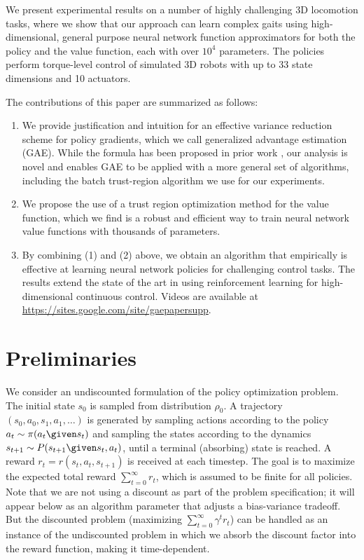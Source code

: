 \documentclass{article}
\begin{document}
We present experimental results on a number of highly challenging 3D locomotion tasks, where we show that our approach can learn complex gaits using high-dimensional, general purpose neural network function approximators for both the policy and the value function, each with over $10^4$ parameters.
The policies perform torque-level control of simulated 3D robots with up to 33 state dimensions and 10 actuators.

The contributions of this paper are summarized as follows:
\begin{enumerate}[leftmargin=*]
\item We provide justification and intuition for an effective variance reduction scheme for policy gradients, which we call generalized advantage estimation (GAE). While the formula has been proposed in prior work \citep{kimura1998analysis,wawrzynski2009real}, our analysis is novel and enables GAE to be applied with a more general set of algorithms, including the batch trust-region algorithm we use for our experiments.
\item We propose the use of a trust region optimization method for the value function, which we find is a robust and efficient way to train neural network value functions with thousands of parameters.
\item By combining (1) and (2) above, we obtain an algorithm that empirically is effective at learning neural network policies for challenging control tasks. The results extend the state of the art in using reinforcement learning for high-dimensional continuous control. Videos are available at \url{https://sites.google.com/site/gaepapersupp}.
\end{enumerate}

\section{Preliminaries}
\label{sec:prelim}

We consider an undiscounted formulation of the policy optimization problem.
The initial state  $s_0$ is sampled from distribution $\rho_0$.
A trajectory $(s_0, a_0, s_1, a_1, \dots)$ is generated by sampling actions according to the policy $a_t \sim \pi(a_t \given s_t)$ and sampling the states according to the dynamics $s_{t+1} \sim P(s_{t+1} \given s_t, a_t)$, until a terminal (absorbing) state is reached.
A reward $r_t = r(s_t,a_t,s_{t+1})$ is received at each timestep.
The goal is to maximize the expected total reward $\sum_{t=0}^{\infty} r_t$, which is assumed to be finite for all policies.
Note that we are not using a discount as part of the problem specification; it will appear below as an algorithm parameter that adjusts a bias-variance tradeoff.
But the discounted problem (maximizing $\sum_{t=0}^{\infty} \gamma^t r_t$) can be handled as an instance of the undiscounted problem in which we absorb the discount factor into the reward function, making it time-dependent.
\end{document}
